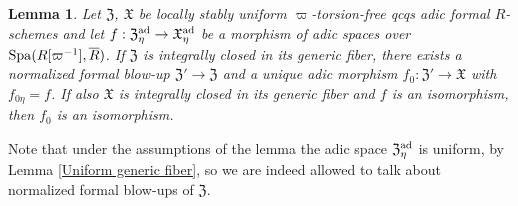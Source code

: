 \documentclass[12pt,twoside,a4paper]{article}
\newtheorem{lemma}[thm]{Lemma}
\theoremstyle{definition}
\theoremstyle{remark}
\newcommand\ad{{\rm ad}}
\newcommand\Spa{{\rm Spa}}
\begin{document}
\begin{lemma}\label{Fullness}Let $\mathfrak{Z}$, $\mathfrak{X}$ be locally stably uniform $\varpi$-torsion-free qcqs adic formal $R$-schemes and let $f: \mathfrak{Z}_{\eta}^{\ad}\to\mathfrak{X}_{\eta}^{\ad}$ be a morphism of adic spaces over $\Spa(R[\varpi^{-1}], \overline{R})$. If $\mathfrak{Z}$ is integrally closed in its generic fiber, there exists a normalized formal blow-up $\mathfrak{Z}'\to\mathfrak{Z}$ and a unique adic morphism $f_{0}: \mathfrak{Z}'\to \mathfrak{X}$ with $f_{0\eta}=f$. If also $\mathfrak{X}$ is integrally closed in its generic fiber and $f$ is an isomorphism, then $f_{0}$ is an isomorphism.\end{lemma}
Note that under the assumptions of the lemma the adic space $\mathfrak{Z}_{\eta}^{\ad}$ is uniform, by Lemma \ref{Uniform generic fiber}, so we are indeed allowed to talk about normalized formal blow-ups of $\mathfrak{Z}$. 
\end{document}
